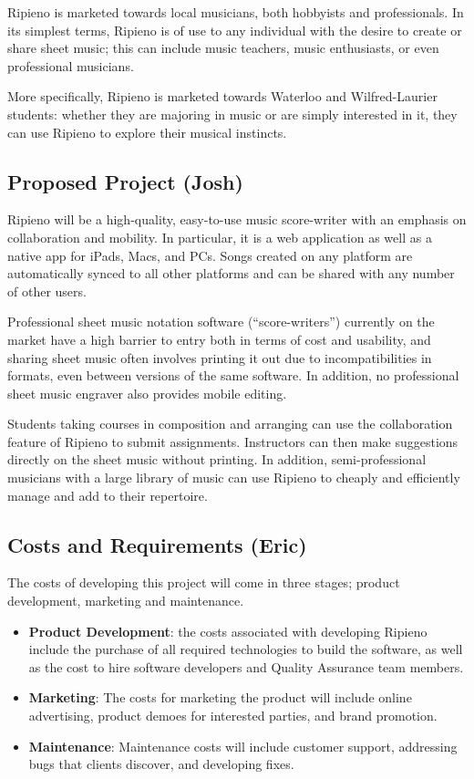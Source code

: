 \documentclass[12pt]{article}
\begin{document}
Ripieno is marketed towards local musicians, both hobbyists and professionals. In its simplest terms, Ripieno is of use to any individual with the desire to create or share sheet music; this can include music teachers, music enthusiasts, or even professional musicians.

More specifically, Ripieno is marketed towards Waterloo and Wilfred-Laurier students: whether they are majoring in music or are simply interested in it, they can use Ripieno to explore their musical instincts.

\subsection{Proposed Project (Josh)}
Ripieno will be a high-quality, easy-to-use music score-writer with an emphasis on collaboration and mobility. In particular, it is a web application as well as a native app for iPads, Macs, and PCs. Songs created on any platform are automatically synced to all other platforms and can be shared with any number of other users.

Professional sheet music notation software (``score-writers'') currently on the market have a high barrier to entry both in terms of cost and usability, and sharing sheet music often involves printing it out due to incompatibilities in formats, even between versions of the same software. In addition, no professional sheet music engraver also provides mobile editing.

Students taking courses in composition and arranging can use the collaboration feature of Ripieno to submit assignments. Instructors can then make suggestions directly on the sheet music without printing. In addition, semi-professional musicians with a large library of music can use Ripieno to cheaply and efficiently manage and add to their repertoire.

\subsection{Costs and Requirements (Eric)}
The costs of developing this project will come in three stages; product development, marketing and maintenance.

\begin{itemize}
\item {\bf Product Development}: the costs associated with developing Ripieno include the purchase of all required technologies to build the software, as well as the cost to hire software developers and Quality Assurance team members.
\item {\bf Marketing}: The costs for marketing the product will include online advertising, product demoes for interested parties, and brand promotion.
\item {\bf Maintenance}: Maintenance costs will include customer support, addressing bugs that clients discover, and developing fixes.
\end{itemize}
\end{document}
